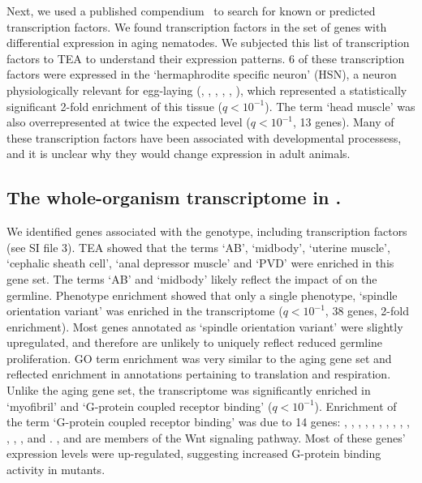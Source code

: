 Next, we used a published compendium~\citep{Reece-Hoyes2005} to search for known
or predicted transcription factors. We found \tfaging{} transcription factors in
the set of genes with differential expression in aging nematodes. We subjected
this list of transcription factors to TEA to understand their expression
patterns. 6 of these transcription factors were expressed in the `hermaphrodite
specific neuron' (HSN), a neuron physiologically relevant for egg-laying
(, , , , ,
), which represented a statistically significant 2-fold enrichment of
this tissue ($q<10^{-1}$). The term `head muscle' was also overrepresented at
twice the expected level ($q<10^{-1}$, 13 genes). Many of these transcription
factors have been  associated with developmental processess, and it is unclear
why they would change expression in adult animals.

\subsection*{The whole-organism \fog{} transcriptome in \cel{}.}
We identified \fogn{} genes associated with the \fog{} genotype, including
\tffog{} transcription factors (see SI file 3). TEA showed that the terms `AB',
`midbody', `uterine muscle', `cephalic sheath cell', `anal depressor muscle' and
`PVD' were enriched in this gene set. The terms `AB' and `midbody' likely reflect
the impact of \fog{} on the germline.
Phenotype enrichment showed that only a single phenotype, `spindle orientation
variant' was enriched in the \fog{} transcriptome ($q<10^{-1}$, 38 genes, 2-fold
enrichment). Most genes annotated as `spindle orientation variant' were
slightly upregulated, and therefore are unlikely to uniquely reflect reduced
germline proliferation. GO term enrichment was very similar to the aging gene
set and reflected enrichment in annotations pertaining to translation and
respiration. Unlike the aging gene set, the \fog{} transcriptome was
significantly enriched in `myofibril' and `G-protein coupled receptor binding'
($q<10^{-1}$). Enrichment of the term `G-protein coupled receptor binding' was
due to 14 genes: , ,  , ,
, , , , ,
,
, , , and .
,
 and  are members of the Wnt signaling pathway.
Most of these genes' expression levels were up-regulated, suggesting increased
G-protein binding activity in \fog{} mutants.

